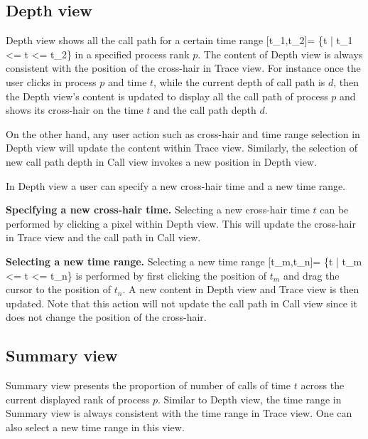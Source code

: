 \documentclass[english]{article}
\begin{document}
\subsection{Depth view}

Depth view shows all the call path for a certain time range [t_1,t_2]= \{t | t_1 <= t <= t_2\} in a specified process rank $p$. The content of Depth view is always consistent with the position of the cross-hair in Trace view.
For instance once the user clicks in process $p$ and time $t$, while the current depth of call path is $d$, then the Depth view's content is updated to display all the call path of process $p$ and shows its cross-hair on the time $t$ and the call path depth $d$.

On the other hand, any user action such as cross-hair and time range selection in Depth view will update the content within Trace view. Similarly, the selection of new call path depth in Call view invokes a new position in Depth view.

In Depth view a user can specify a new cross-hair time and a new time range.

\textbf{Specifying a new cross-hair time.} Selecting a new cross-hair time $t$ can be performed by clicking a pixel within Depth view. This will update the cross-hair in Trace view and the call path in Call view.

\textbf{Selecting a new time range.} Selecting a new time range [t_m,t_n]= \{t | t_m <= t <= t_n\} is performed by first clicking the position of $t_m$ and drag the cursor to the position of $t_n$. A new content in Depth view and Trace view is then updated. Note that this action will not update the call path in Call view since it does not change the position of the cross-hair.


\subsection{Summary view}

Summary view presents the proportion of number of calls of time $t$ across the current displayed rank of process $p$.
Similar to Depth view, the time range in Summary view is always consistent with the time range in Trace view.
One can also select a new time range in this view.
\end{document}
